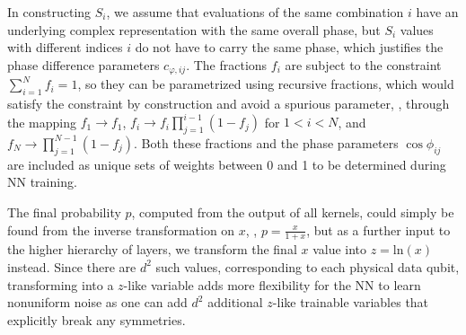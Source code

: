 In constructing $S_i$, we assume that evaluations of the same combination $i$ have an underlying complex representation with the same overall phase, but $S_i$ values with different indices $i$ do not have to carry the same phase, which justifies the phase difference parameters $c_{\varphi, ij}$.
The fractions $f_i$ are subject to the constraint $\sum_{i=1}^{N} f_i = 1$, so they can be parametrized using recursive fractions, which would satisfy the constraint by construction and avoid a spurious parameter, \ie, through the mapping $f_1 \to f_1$, $f_i \to f_i\prod_{j=1}^{i-1}\left(1-f_j\right)$ for $1<i<N$, and $f_N \to \prod_{j=1}^{N-1}\left(1-f_j\right)$. Both these fractions and the phase parameters $\cos{\phi_{ij}}$ are included as unique sets of weights between 0 and 1 to be determined during NN training.

The final probability $p$, computed from the output of all kernels, could simply be found from the inverse transformation on $x$, \ie, $p=\frac{x}{1+x}$, but as a further input to the higher hierarchy of layers, we transform the final $x$ value into $z=\text{ln}(x)$ instead. Since there are $d^2$ such values, corresponding to each physical data qubit, transforming into a $z$-like variable adds more flexibility for the NN to learn nonuniform noise as one can add $d^2$ additional $z$-like trainable variables that explicitly break any symmetries.

